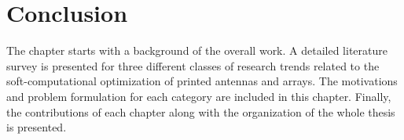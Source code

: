 \section{Conclusion} \label{c1sec_concl}
The chapter starts with a background of the overall work. A detailed literature survey is presented for three different classes of research trends related to the soft-computational optimization of printed antennas and arrays. The motivations and problem formulation for each category are included in this chapter. Finally, the contributions of each chapter along with the organization of the whole thesis is presented. 
